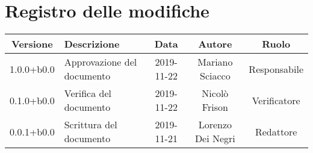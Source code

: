 \section*{Registro delle modifiche}

\begin{center}
	\begin{longtable}{|c|p{3cm}|c|c|c|}
	\hline
	\rowcolor{lighter-grayer}
	\textbf{Versione} & \textbf{Descrizione} & \textbf{Data} & \textbf{Autore} & \textbf{Ruolo} \\
	\hline
	\endfirsthead


	1.0.0+b0.0 & Approvazione del documento & 2019-11-22 & Mariano Sciacco & Responsabile \\
	\hline
	0.1.0+b0.0 & Verifica del documento & 2019-11-22 & Nicolò Frison & Verificatore \\
	\hline
	0.0.1+b0.0 & Scrittura del documento & 2019-11-21 & Lorenzo Dei Negri & Redattore \\

	\hline

	\end{longtable}
\end{center}
